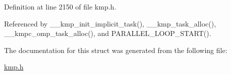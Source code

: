 Definition at line 2150 of file kmp.\-h.



Referenced by \-\_\-\-\_\-kmp\-\_\-init\-\_\-implicit\-\_\-task(), \-\_\-\-\_\-kmp\-\_\-task\-\_\-alloc(), \-\_\-\-\_\-kmpc\-\_\-omp\-\_\-task\-\_\-alloc(), and P\-A\-R\-A\-L\-L\-E\-L\-\_\-\-L\-O\-O\-P\-\_\-\-S\-T\-A\-R\-T().



The documentation for this struct was generated from the following file\-:\begin{DoxyCompactItemize}
\item 
\hyperlink{kmp_8h}{kmp.\-h}\end{DoxyCompactItemize}
